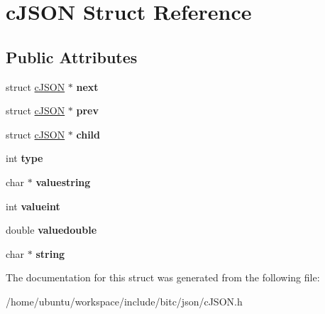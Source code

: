 \hypertarget{structcJSON}{\section{c\-J\-S\-O\-N Struct Reference}
\label{structcJSON}
}
\subsection*{Public Attributes}
\begin{DoxyCompactItemize}
\item 
\hypertarget{structcJSON_ade862b880379b5e2a591f7326401fa8d}{struct \hyperlink{structcJSON}{c\-J\-S\-O\-N} $\ast$ {\bfseries next}}\label{structcJSON_ade862b880379b5e2a591f7326401fa8d}

\item 
\hypertarget{structcJSON_a488a393f610347821fce8e985e79fc2f}{struct \hyperlink{structcJSON}{c\-J\-S\-O\-N} $\ast$ {\bfseries prev}}\label{structcJSON_a488a393f610347821fce8e985e79fc2f}

\item 
\hypertarget{structcJSON_a401b274c2da358dac5c23ab8b2c71f85}{struct \hyperlink{structcJSON}{c\-J\-S\-O\-N} $\ast$ {\bfseries child}}\label{structcJSON_a401b274c2da358dac5c23ab8b2c71f85}

\item 
\hypertarget{structcJSON_ab13084c574681593b12f6e0a3db0dcfc}{int {\bfseries type}}\label{structcJSON_ab13084c574681593b12f6e0a3db0dcfc}

\item 
\hypertarget{structcJSON_ad43f8de2571e504c4c5ce0a36990e6e1}{char $\ast$ {\bfseries valuestring}}\label{structcJSON_ad43f8de2571e504c4c5ce0a36990e6e1}

\item 
\hypertarget{structcJSON_a369cea49494eb5d4409d532a731a0fbf}{int {\bfseries valueint}}\label{structcJSON_a369cea49494eb5d4409d532a731a0fbf}

\item 
\hypertarget{structcJSON_a4b21817d0fd2919901abadac73214e7f}{double {\bfseries valuedouble}}\label{structcJSON_a4b21817d0fd2919901abadac73214e7f}

\item 
\hypertarget{structcJSON_aa6b47e9a4b0e0a26f519b1a2b6739983}{char $\ast$ {\bfseries string}}\label{structcJSON_aa6b47e9a4b0e0a26f519b1a2b6739983}

\end{DoxyCompactItemize}


The documentation for this struct was generated from the following file\-:\begin{DoxyCompactItemize}
\item 
/home/ubuntu/workspace/include/bitc/json/c\-J\-S\-O\-N.\-h\end{DoxyCompactItemize}

